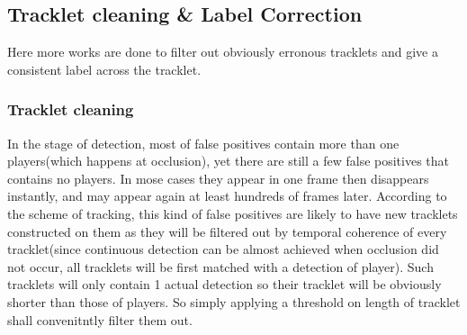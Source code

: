 \documentclass{article}
\begin{document}
\subsection{Tracklet cleaning \& Label Correction}
Here more works are done to filter out obviously erronous tracklets and give a consistent label across the tracklet.
\subsubsection{Tracklet cleaning}
In the stage of detection, most of false positives contain more than one players(which happens at occlusion), yet there are still a few false positives that contains no players. In mose cases they appear in one frame then disappears instantly, and may appear again at least hundreds of frames later. According to the scheme of tracking, this kind of false positives are likely to have new tracklets constructed on them as they will be filtered out by temporal coherence of every tracklet(since continuous detection can be almost achieved when occlusion did not occur, all tracklets will be first matched with a detection of player). Such tracklets will only contain 1 actual detection so their tracklet will be obviously shorter than those of players. So simply applying a threshold on length of tracklet shall convenitntly filter them out.
\end{document}
